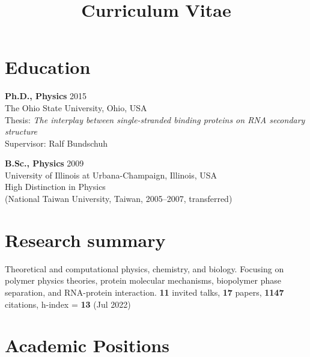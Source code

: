 \documentclass[11pt]{../yhlcv}
\begin{document}
\title{Curriculum Vitae}

\maketitle

\raggedright

\section*{Education}

{\bf Ph.D., Physics} \hfill 2015 \vspace{0.25em}\\
The Ohio State University, Ohio, USA \\
Thesis: {\it  The interplay between single-stranded binding proteins on RNA secondary structure} \\
Supervisor: Ralf Bundschuh

{\bf B.Sc., Physics} \hfill 2009 \vspace{0.25em}\\
University of Illinois at Urbana-Champaign, Illinois, USA \\
High Distinction in Physics \\
{\small (National Taiwan University, Taiwan, 2005--2007, transferred)}

\section*{Research summary}

Theoretical and computational physics, chemistry, and biology. Focusing on polymer physics theories, protein molecular mechanisms, biopolymer phase separation, and RNA-protein interaction. 
{\bf 11} invited talks, {\bf 17} papers, {\bf 1147} citations, h-index = {\bf 13} (Jul 2022)

\section*{Academic Positions}
\end{document}
